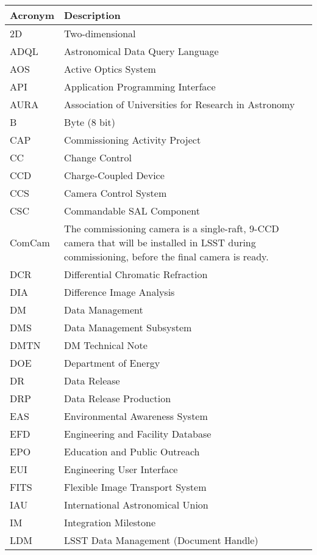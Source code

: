 \addtocounter{table}{-1}
\begin{longtable}{p{}p{}}\hline
\textbf{Acronym} & \textbf{Description}  \\\hline

2D & Two-dimensional \\\hline
ADQL & Astronomical Data Query Language \\\hline
AOS & Active Optics System \\\hline
API & Application Programming Interface \\\hline
AURA & Association of Universities for Research in Astronomy \\\hline
B & Byte (8 bit) \\\hline
CAP & Commissioning Activity Project \\\hline
CC & Change Control \\\hline
CCD & Charge-Coupled Device \\\hline
CCS & Camera Control System \\\hline
CSC & Commandable SAL Component \\\hline
ComCam & The commissioning camera is a single-raft, 9-CCD camera that will be installed in LSST during commissioning, before the final camera is ready. \\\hline
DCR & Differential Chromatic Refraction \\\hline
DIA & Difference Image Analysis \\\hline
DM & Data Management \\\hline
DMS & Data Management Subsystem \\\hline
DMTN & DM Technical Note \\\hline
DOE & Department of Energy \\\hline
DR & Data Release \\\hline
DRP & Data Release Production \\\hline
EAS & Environmental Awareness System \\\hline
EFD & Engineering and Facility Database \\\hline
EPO & Education and Public Outreach \\\hline
EUI & Engineering User Interface \\\hline
FITS & Flexible Image Transport System \\\hline
IAU & International Astronomical Union \\\hline
IM & Integration Milestone \\\hline
LDM & LSST Data Management (Document Handle) \\\hline

\end{longtable}
